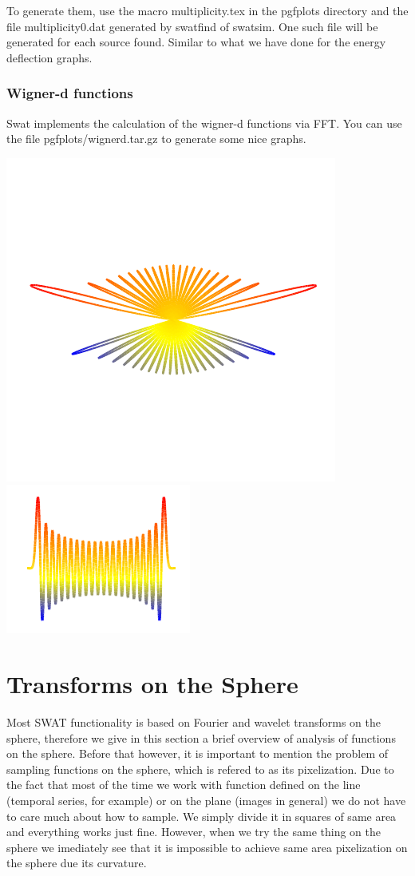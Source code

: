 \documentclass[12pt]{article}
\begin{document}
To generate them, use the macro {\color{brown}multiplicity.tex} in the pgfplots directory
and the file {\color{brown}multiplicity0.dat} generated by swatfind of swatsim.
One such file will be generated for each source found.
Similar to what we have done for the energy deflection graphs.


\subsubsection{Wigner-d functions}

Swat implements the calculation of the wigner-d functions via FFT.
You can use the file pgfplots/wignerd.tar.gz to generate some nice graphs.

\includegraphics[scale=1.0]{wignerpolar.pdf}
\includegraphics[scale=1.0]{wigner.pdf} 
\section{Transforms on the Sphere}
Most SWAT functionality is based on Fourier and wavelet transforms on the sphere, therefore we give
in this section a brief overview of analysis of functions on the sphere. Before
that however, it is important to mention the problem of sampling functions on
the sphere, which is refered to as its pixelization.  Due to the fact
that most of the time we work with function defined on the line (temporal
series, for example) or on the plane (images in general) we do not have to care
much about how to sample. We simply divide it in squares of same area and everything works
just fine. However, when we try the same thing on the sphere we imediately see
that it is impossible to achieve same area pixelization on the sphere due its curvature.
\end{document}
